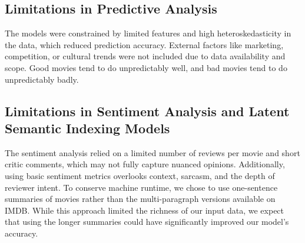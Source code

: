 \documentclass{article}
\begin{document}
\subsection{Limitations in Predictive Analysis}
The models were constrained by limited features and high heteroskedasticity in the data, which reduced prediction accuracy. External factors like marketing, competition, or cultural trends were not included due to data availability and scope. Good movies tend to do unpredictably well, and bad movies tend to do unpredictably badly.

\subsection{Limitations in Sentiment Analysis and Latent Semantic Indexing Models}
The sentiment analysis relied on a limited number of reviews per movie and short critic comments, which may not fully capture nuanced opinions. Additionally, using basic sentiment metrics overlooks context, sarcasm, and the depth of reviewer intent. To conserve machine runtime, we chose to use one-sentence summaries of movies rather than the multi-paragraph versions available on IMDB. While this approach limited the richness of our input data, we expect that using the longer summaries could have significantly improved our model's accuracy.
\end{document}
